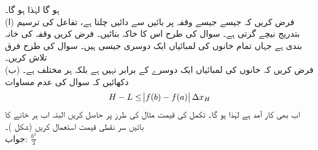 ہو گا لہٰذا  ہو گا۔
\\
(ا) \quad
فرض کریں کہ جیسے جیسے   وقفہ  پر بائیں سے دائیں چلتا ہے، تفاعل  کی ترسیم بتدریج نیچے گرتی ہے۔ سوال  کی طرح اس کا خاکہ بنائیں۔ فرض کریں وقفہ  کی خانہ بندی  ہے جہاں تمام خانوں کی لمبائیاں  ایک دوسری جیسی ہیں۔ سوال  کی طرح فرق  تلاش کریں۔\\
(ب) \quad
فرض کریں کہ خانوں کی لمبائیاں ایک دوسرے کے برابر نہیں ہے بلکہ ہر  مختلف ہے۔ دکھائیں کہ سوال  کی عدم مساوات
\begin{align*}
H-L\le \abs{f(b)-f(a)}\Delta x_H
\end{align*}
اب بھی کار آمد ہے  لہٰذا  ہو گا۔
تکمل  کی قیمت مثال  کی طرز پر حاصل کریں البتہ اب ہر خانے کا بائیں سر نقطی قیمت استعمال کریں (شکل )۔\\
جواب:\quad
$\tfrac{b^3}{3}$
